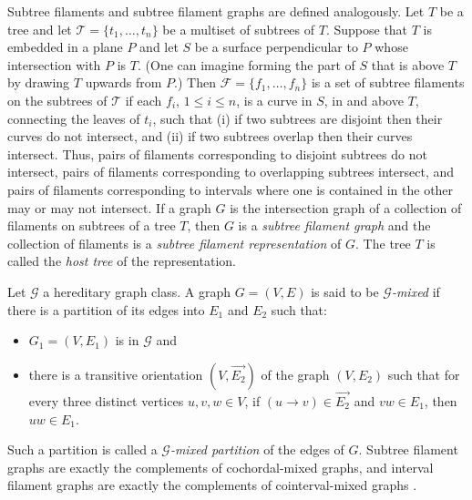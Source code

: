 \documentclass[
final
]{dmtcs-episciences}        \usepackage{graphics, amsthm, amsmath, amssymb, algorithm, algorithmic}
\begin{document}
Subtree filaments and subtree filament graphs are defined analogously.
Let $T$ be a tree and let $\mathcal T = \{ t_1, \ldots, t_n \}$ be a multiset of subtrees of $T$. Suppose that $T$ is embedded in a plane $P$ and let $S$ be a surface perpendicular to $P$ whose intersection with $P$ is $T$. 
(One can imagine forming the part of $S$ that is above $T$ by drawing $T$ upwards from $P$.)
Then $\mathcal F = \{f_1, \ldots, f_n \}$ is a set of subtree filaments on the subtrees of $\mathcal T$ if
each $f_i$, $1 \le i \le n$, is a curve in $S$, in and above $T$, connecting the leaves of $t_i$, such that 
(i) if two subtrees are disjoint then their curves do not intersect, and
(ii) if two subtrees overlap then their curves intersect.
Thus, pairs of filaments corresponding to disjoint subtrees do not intersect, pairs of filaments corresponding to overlapping subtrees intersect, and 
pairs of filaments corresponding to intervals where one is contained in the other may or may not intersect.
If a graph $G$ is the intersection graph of a collection of filaments on subtrees of a tree $T$, then $G$ is a {\em subtree filament graph} and the collection of filaments is a {\em subtree filament representation} of $G$. The tree $T$ is called the {\em host tree} of the representation. 

Let $\mathcal{G}$ a hereditary graph class. A graph $G = (V, E)$ is said to be {\em $\mathcal{G}$-mixed} if there is a partition of its edges into $E_1$ and $E_2$ such that:
\begin{itemize}
 \item $G_1 = (V, E_1)$ is in $\mathcal{G}$ and 
 \item there is a transitive orientation 
$ (V, \overrightarrow{E_2})$ 
 of the graph $(V, E_2)$ such that
 for every three distinct vertices $u,v,w \in V$, if
      $(u \rightarrow v) \in \overrightarrow{E_2}$ and $v w \in E_1$, then $u w \in E_1$.
 \end{itemize}
Such a partition is called a {\em $\mathcal{G}$-mixed partition} of the edges of $G$.
Subtree filament graphs are exactly the complements of cochordal-mixed graphs, and interval filament graphs are exactly the complements of cointerval-mixed graphs \cite{gavril2000}.
 
\end{document}
